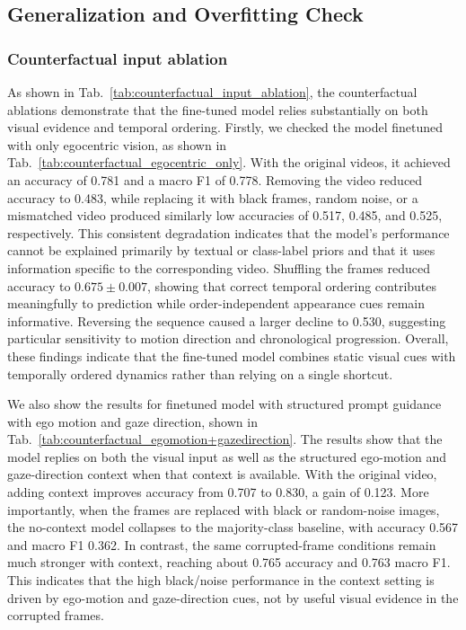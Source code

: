 \documentclass[letterpaper, 10pt, journal]{IEEEtran}  %
\begin{document}
\subsection{Generalization and Overfitting Check}

\subsubsection{Counterfactual input ablation}
As shown in Tab.~\ref{tab:counterfactual_input_ablation}, the counterfactual ablations demonstrate that the fine-tuned model relies substantially on both visual evidence and temporal ordering. 
Firstly, we checked the model finetuned with only egocentric vision, as shown in Tab.~\ref{tab:counterfactual_egocentric_only}. 
With the original videos, it achieved an accuracy of 0.781 and a macro F1 of 0.778. Removing the video reduced accuracy to 0.483, while replacing it with black frames, random noise, or a mismatched video produced similarly low accuracies of 0.517, 0.485, and 0.525, respectively. This consistent degradation indicates that the model’s performance cannot be explained primarily by textual or class-label priors and that it uses information specific to the corresponding video. Shuffling the frames reduced accuracy to \(0.675 \pm 0.007\), showing that correct temporal ordering contributes meaningfully to prediction while order-independent appearance cues remain informative. Reversing the sequence caused a larger decline to 0.530, suggesting particular sensitivity to motion direction and chronological progression. Overall, these findings indicate that the fine-tuned model combines static visual cues with temporally ordered dynamics rather than relying on a single shortcut.

We also show the results for finetuned model with structured prompt guidance with ego motion and gaze direction, shown in Tab.~\ref{tab:counterfactual_egomotion+gazedirection}. The results show that the model replies on both the visual input as well as the structured ego-motion and gaze-direction context when that context is available. 
With the original video, adding context improves accuracy from 0.707 to 0.830, a gain of 0.123. More importantly, when the frames are replaced with black or random-noise images, the no-context model collapses to the majority-class baseline, with accuracy 0.567 and macro F1 0.362. In contrast, the same corrupted-frame conditions remain much stronger with context, reaching about 0.765 accuracy and 0.763 macro F1. This indicates that the high black/noise performance in the context setting is driven by ego-motion and gaze-direction cues, not by useful visual evidence in the corrupted frames.
\end{document}
